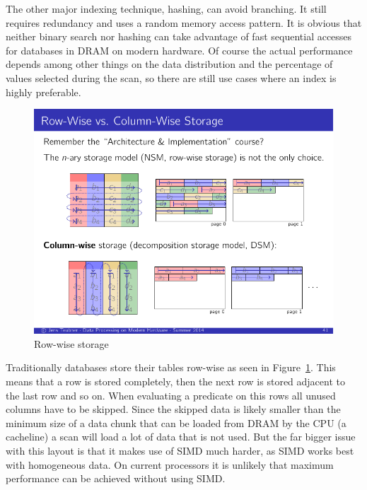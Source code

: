 The other major indexing technique, hashing, can avoid branching. It still
requires redundancy and uses a random memory access pattern. It is obvious that
neither binary search nor hashing can take advantage of fast sequential accesses
for databases in DRAM on modern hardware. Of course the actual performance
depends among other things on the data distribution and the percentage of values
selected during the scan, so there are still use cases where an index is highly
preferable.

\begin{figure}[h] \begin{center}
\includegraphics[scale=1.25]{images/rowstore}
\end{center}
\caption{Row-wise storage~\cite{JensDPMH}}
\label{fig:rowstore}
\end{figure}

Traditionally databases store their tables row-wise as seen in
Figure~\ref{fig:rowstore}. This means that a row is stored completely, then the
next row is stored adjacent to the last row and so on. When evaluating a
predicate on this rows all unused columns have to be skipped. Since the skipped
data is likely smaller than the minimum size of a data chunk that can be loaded
from DRAM by the CPU (a cacheline) a scan will load a lot of data that is not
used. But the far bigger issue with this layout is that it makes use of SIMD
much harder, as SIMD works best with homogeneous data. On current processors it
is unlikely that maximum performance can be achieved without using SIMD.

